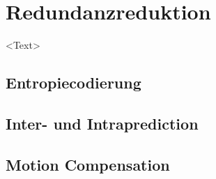 \chapter{Redundanzreduktion}
\label{kap:Redundanzreduktion}
<Text>

\section{Entropiecodierung}

\section{Inter- und Intraprediction}

\section{Motion Compensation}